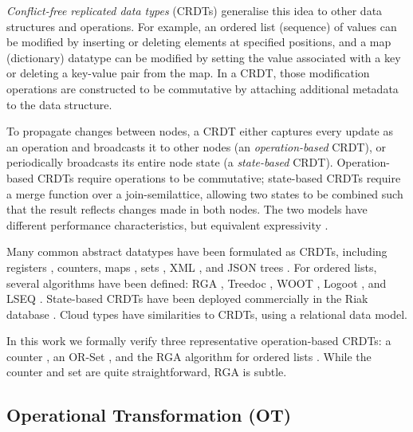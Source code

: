 \emph{Conflict-free replicated data types} (CRDTs) generalise this idea to other data structures and
operations. For example, an ordered list (sequence) of values can be modified by inserting or
deleting elements at specified positions, and a map (dictionary) datatype can be modified by setting
the value associated with a key or deleting a key-value pair from the map. In a CRDT, those
modification operations are constructed to be commutative by attaching additional metadata to the
data structure.

To propagate changes between nodes, a CRDT either captures every update as an operation and
broadcasts it to other nodes (an \emph{operation-based} CRDT), or periodically broadcasts its
entire node state (a \emph{state-based} CRDT). Operation-based CRDTs require operations to be
commutative; state-based CRDTs require a merge function over a join-semilattice, allowing two states
to be combined such that the result reflects changes made in both nodes. The two models have
different performance characteristics, but equivalent expressivity
\cite{Shapiro:2011wy,Shapiro:2011un}.

Many common abstract datatypes have been formulated as CRDTs, including
registers \cite{Shapiro:2011wy,Shapiro:2011un}, counters, maps \cite{Baquero:2016iv},
sets \cite{Bieniusa:2012wu,Bieniusa:2012gt}, XML \cite{Martin:2010ih},
and JSON trees \cite{Kleppmann:2016ve}. For ordered lists, several algorithms have been defined:
RGA \cite{Roh:2011dw}, Treedoc \cite{Preguica:2009fz}, WOOT \cite{Oster:2006wj},
Logoot \cite{Weiss:2010hx}, and LSEQ \cite{Nedelec:2013ky,Nedelec:2016eo}.
State-based CRDTs have been deployed commercially in the Riak database \cite{Brown:2014hs}.
Cloud types \cite{Burckhardt:2012jy} have similarities to CRDTs, using a relational data model.

In this work we formally verify three representative operation-based CRDTs: a counter
\cite{Shapiro:2011wy}, an OR-Set \cite{Bieniusa:2012gt}, and the RGA algorithm for ordered lists
\cite{Roh:2011dw}. While the counter and set are quite straightforward, RGA is subtle.


\subsection{Operational Transformation (OT)}\label{sect.related.ot}

